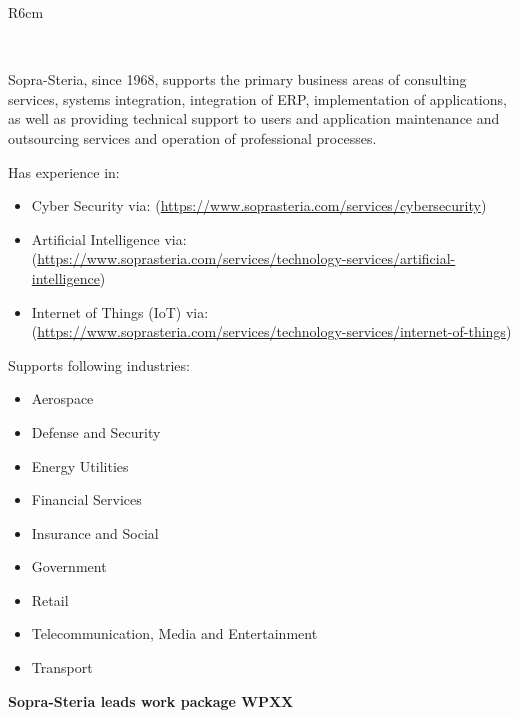 \documentclass[a4paper,11pt]{article}
\begin{document}



\begin{wrapfigure}{R}{6cm}
\vspace{-2cm}
\hfill {}
\vspace{-1cm}
\end{wrapfigure}

\ 


Sopra-Steria, since 1968, supports the primary business areas of consulting services, systems integration, integration of ERP, implementation of applications, as well as providing technical support to users and application maintenance and outsourcing services and operation of professional processes.

Has experience in:

\begin{itemize}
    \item Cyber Security via: (\url{https://www.soprasteria.com/services/cybersecurity})
    \item Artificial Intelligence via:\\ (\url{https://www.soprasteria.com/services/technology-services/artificial-intelligence})
    \item Internet of Things (IoT) via:\\ (\url{https://www.soprasteria.com/services/technology-services/internet-of-things})
\end{itemize}

Supports following industries:
\begin{itemize}
    \item Aerospace
    \item Defense and Security
    \item Energy Utilities
    \item Financial Services
    \item Insurance and Social
    \item Government
    \item Retail
    \item Telecommunication, Media and Entertainment
    \item Transport
\end{itemize}



\vspace{10pt}
\textbf{Sopra-Steria leads work package WPXX}
\end{document}

